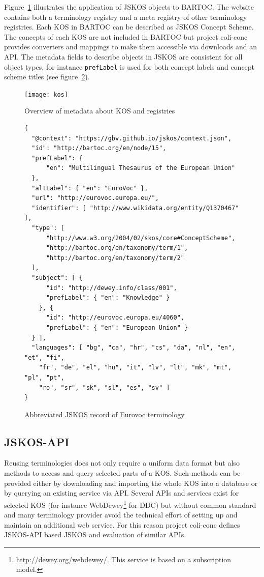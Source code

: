 \documentclass[12pt,a4paper]{llncs}
\begin{document}
\noindent
Figure~\ref{fig:kos} illustrates the application of JSKOS objects to BARTOC. The website contains both a terminology registry and a meta registry of other terminology registries. Each KOS in BARTOC can be described as JSKOS Concept Scheme. The concepts of each KOS are not included in BARTOC but project coli-conc provides converters and mappings to make them accessible via downloads and an API. The metadata fields to describe objects in JSKOS are consistent for all object types, for instance \verb|prefLabel| is used for both concept labels and concept scheme titles (see figure~\ref{fig:concept-scheme-example}).

\begin{figure}
\texttt{[image: kos]}
\caption{Overview of metadata about KOS and registries}
\label{fig:kos}
\end{figure}

\begin{figure}
\begin{verbatim}
{
  "@context": "https://gbv.github.io/jskos/context.json",
  "id": "http://bartoc.org/en/node/15",
  "prefLabel": {
      "en": "Multilingual Thesaurus of the European Union"
  },
  "altLabel": { "en": "EuroVoc" },
  "url": "http://eurovoc.europa.eu/",
  "identifier": [ "http://www.wikidata.org/entity/Q1370467" ],
  "type": [
      "http://www.w3.org/2004/02/skos/core#ConceptScheme",
      "http://bartoc.org/en/taxonomy/term/1",
      "http://bartoc.org/en/taxonomy/term/2"
  ],
  "subject": [ {
      "id": "http://dewey.info/class/001",
      "prefLabel": { "en": "Knowledge" }
    }, {
      "id": "http://eurovoc.europa.eu/4060",
      "prefLabel": { "en": "European Union" }
  } ],
  "languages": [ "bg", "ca", "hr", "cs", "da", "nl", "en", "et", "fi",
    "fr", "de", "el", "hu", "it", "lv", "lt", "mk", "mt", "pl", "pt",
    "ro", "sr", "sk", "sl", "es", "sv" ]
}
\end{verbatim}
\caption{Abbreviated JSKOS record of Eurovoc terminology}
\label{fig:concept-scheme-example}
\end{figure}

\subsection{JSKOS-API}
Reusing terminologies does not only require a uniform data format but also methods to access and query selected parts of a KOS. Such methods can be provided either by downloading and importing the whole KOS into a database or by querying an existing service via API. Several APIs and services exist for selected KOS (for instance WebDewey\footnote{\url{http://dewey.org/webdewey/}. This service is based on a subscription model.} for DDC) but without common standard and many terminology provider avoid the technical effort of setting up and maintain an additional web service. For this reason project coli-conc defines JSKOS-API based JSKOS and evaluation of similar APIs.
\end{document}
